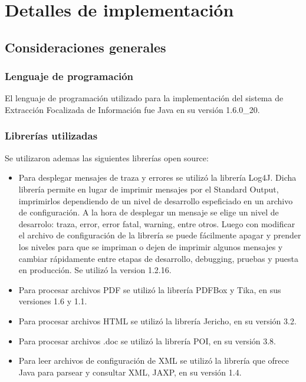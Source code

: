 \chapter{Detalles de implementación} \label{chap:implementacion}

\section{Consideraciones generales} \label{sect:implementacion-consideraciones}

\subsection{Lenguaje de programación} \label{sect:implementacion-lenguaje}

El lenguaje de programación utilizado para la implementación del sistema de Extracción Focalizada de Información fue Java en su versión 1.6.0\_20. \\

\subsection{Librerías utilizadas} \label{sect:implementacion-librerias}


Se utilizaron ademas las siguientes librerías open source: 

\begin{itemize}
\item Para desplegar mensajes de traza y errores se utilizó la librería Log4J. Dicha librería permite en lugar de imprimir mensajes por el Standard Output, imprimirlos dependiendo de un nivel de desarrollo espeficiado en un archivo de configuración. A la hora de desplegar un mensaje se elige un nivel de desarrolo: traza, error, error fatal, warning, entre otros. Luego con modificar el archivo de configuración de la librería se puede fácilmente apagar y prender los niveles para que se impriman o dejen de imprimir algunos mensajes y cambiar rápidamente entre etapas de desarrollo, debugging, pruebas y puesta en producción. Se utilizó la version 1.2.16.
\item Para procesar archivos PDF se utilizó la librería PDFBox y Tika, en sus versiones 1.6 y 1.1.
\item Para procesar archivos HTML se utilizó la librería Jericho, en su versión 3.2.
\item Para procesar archivos .doc se utilizó la librería POI, en su versión 3.8.
\item Para leer archivos de configuración de XML se utilizó la librería que ofrece Java para parsear y consultar XML, JAXP, en su versión 1.4.

\end{itemize}

